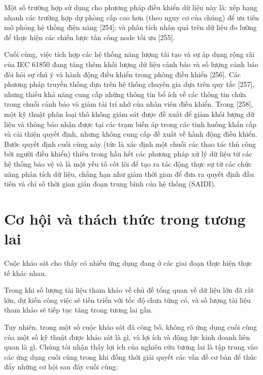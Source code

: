 \documentclass[utf8]{frontiersSCNS} %
\begin{document}
Một số trường hợp sử dụng cho phương pháp điều khiển dữ liệu này là: xếp hạng nhanh các trường hợp dự phòng cấp cao hơn (theo nguy cơ của chúng) để ưu tiên mô phỏng hệ thống điện năng [254]; và phân tích nhân quả trên dữ liệu đo lường để thực hiện các chiến lược tấn công node tối ưu [255].

Cuối cùng, việc tích hợp các hệ thống năng lượng tái tạo và sự áp dụng rộng rãi của IEC 61850 đang tăng thêm khối lượng dữ liệu cảnh báo và số lượng cảnh báo đòi hỏi sự chú ý và hành động điều khiển trong phòng điều khiển [256]. Các phương pháp truyền thống dựa trên hệ thống chuyên gia dựa trên quy tắc [257], nhưng thiếu khả năng cung cấp những thông tin bổ ích về các thông tin chứa trong chuỗi cảnh báo và giảm tải trí nhớ của nhân viên điều khiển. Trong [258], một kỹ thuật phân loại thô không giám sát được đề xuất để giảm khối lượng dữ liệu và thông báo nhận được tại các trạm biến áp trong các tình huống khẩn cấp và cải thiện quyết định, nhưng không cung cấp đề xuất về hành động điều khiển. Bước quyết định cuối cùng này (tức là xác định một chuỗi các thao tác thủ công bởi người điều khiển) thiếu trong hầu hết các phương pháp xử lý dữ liệu từ các hệ thống bảo vệ và là một yếu tố cốt lõi để tạo ra tác động thực sự từ các chức năng phân tích dữ liệu, chẳng hạn như giảm thời gian để đưa ra quyết định đầu tiên và chỉ số thời gian gián đoạn trung bình của hệ thống (SAIDI).

\section{Cơ hội và thách thức trong tương lai}

Cuộc khảo sát cho thấy có nhiều ứng dụng đang ở các giai đoạn thực hiện thực tế khác nhau. 

Trong khi số lượng tài liệu tham khảo về chủ đề tổng quan về dữ liệu lớn đã rất lớn, dự kiến công việc sẽ tiến triển với tốc độ chưa từng có, và số lượng tài liệu tham khảo sẽ tiếp tục tăng trong tương lai gần.

Tuy nhiên, trong một số cuộc khảo sát đã công bố, không rõ ứng dụng cuối cùng của một số kỹ thuật được khảo sát là gì, và lợi ích và động lực kinh doanh liên quan là gì. Chúng tôi nhận thấy lợi ích của nghiên cứu tương lai là tập trung vào các ứng dụng cuối cùng trong khi đồng thời giải quyết các vấn đề cơ bản để thúc đẩy những cơ hội sau đây cuối cùng:
\end{document}

